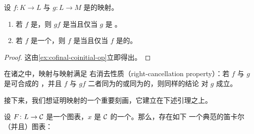 \begin{corollary}\label{cor:coinitial-dual}
设 $f\colon K \to L$ 与 $g\colon L \to M$ 是\trSimplicialSets{}的映射。
\begin{enumerate}[label=(\arabic*)]
  \item 若 $f$ 是\trCoinitial{}，则 $gf$ 是\trCoinitial{}当且仅当 $g$ 是%
        \trCoinitial{}。
  \item 若 $f$ 是一个\trMonomorphism{}，则 $f$ 是\trCoinitial{}当且仅当 $f$
        是\trLeftAnodyne{}的。
\end{enumerate}
\end{corollary}

\begin{proof}
这由\cref{ex:cofinal-coinitial-op}立即得出。
\end{proof}

\begin{corollary}\label{cor:right-cancellation}
在诸\trMonomorphism{}之中，\trLeftAnodyne{}映射与\trRightAnodyne{}映射满足
右消去性质（right-cancellation property）：若 $f$ 与 $g$ 是可合成的%
\trMorphism{}，并且
$f$ 与 $gf$ 二者同为\trLeftAnodyne{}的或同为\trRightAnodyne{}的，则同样的结论
对 $g$ 成立。
\end{corollary}

接下来，我们想证明\trCofinal{}映射的一个重要刻画，它建立在下述引理之上。

\begin{lemma}\label{lem:tilde-map-slice-cartesian}
设 $F\colon L \to \mathcal{C}$ 是一个图表，$x$ 是 $\mathcal{C}$ 的一个\trObject{}。那么，存在如下
一个典范的笛卡尔（并且\trHomotopyCartesian{}）图表：
\begin{center}
\end{center}
\end{lemma}

